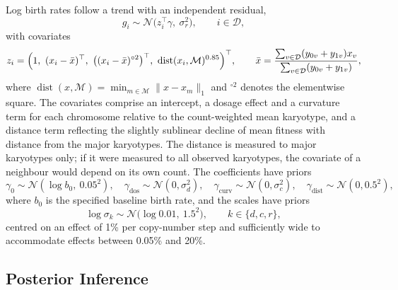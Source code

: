 \documentclass[11pt]{article}
\newcommand{\Normal}{\mathcal{N}}
\begin{document}
Log birth rates follow a trend with an independent residual,
\begin{equation}
  g_i\sim\Normal\bigl(z_i^\top\gamma,\ \sigma_r^2\bigr),\qquad i\in\mathcal{D},
  \label{eq:trend}
\end{equation}
with covariates
\begin{equation}
  z_i=\Bigl(1,\ (x_i-\bar x)^\top,\ \bigl((x_i-\bar x)^{\circ2}\bigr)^\top,\
  \operatorname{dist}(x_i,\mathcal{M})^{0.85}\Bigr)^\top,
  \qquad
  \bar x=\frac{\sum_{v\in\mathcal D}(y_{0v}+y_{1v})x_v}{\sum_{v\in\mathcal D}(y_{0v}+y_{1v})},
  \label{eq:design}
\end{equation}
where $\operatorname{dist}(x,\mathcal{M})=\min_{m\in\mathcal{M}}\|x-x_m\|_1$
and $^{\circ2}$ denotes the elementwise square. The covariates comprise an
intercept, a dosage effect and a curvature term for each chromosome relative
to the count-weighted mean karyotype, and a distance term reflecting the
slightly sublinear decline of mean fitness with distance from the major
karyotypes. The distance is measured to major karyotypes only; if it were
measured to all observed karyotypes, the covariate of a neighbour would depend
on its own count. The coefficients have priors
\begin{equation}
  \gamma_0\sim\Normal(\log b_0,\ 0.05^2),\quad
  \gamma_{\mathrm{dos}}\sim\Normal(0,\sigma_d^2),\quad
  \gamma_{\mathrm{curv}}\sim\Normal(0,\sigma_c^2),\quad
  \gamma_{\mathrm{dist}}\sim\Normal(0,0.5^2),
  \label{eq:coef-prior}
\end{equation}
where $b_0$ is the specified baseline birth rate, and the scales have priors
\begin{equation}
  \log\sigma_k\sim\Normal\bigl(\log 0.01,\ 1.5^2\bigr),\qquad k\in\{d,c,r\},
  \label{eq:scale-prior}
\end{equation}
centred on an effect of 1\% per copy-number step and sufficiently wide to
accommodate effects between 0.05\% and 20\%.

\subsection{Posterior Inference}
\label{sec:sj-inference}
\end{document}
